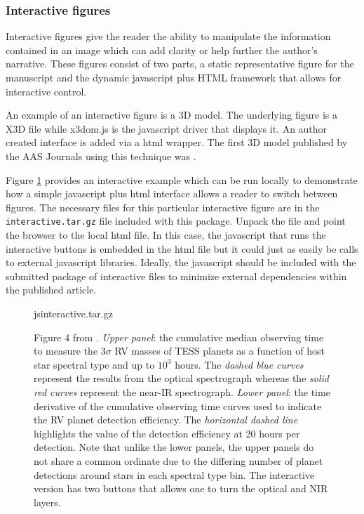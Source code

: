 \documentclass{aastex63}
\begin{document}
\subsubsection{Interactive figures \label{sec:interactive}}

Interactive figures give the reader the ability to manipulate the
information contained in an image which can add clarity or help further the
author's narrative.  These figures consist of two parts, a static 
representative figure for the manuscript and the dynamic javascript plus
HTML framework that allows for interactive control.

An example of an interactive figure is a 3D model.
The underlying figure is a X3D file while x3dom.js is the javascript driver
that displays it. An author created interface is added via a html wrapper.
The first 3D model published by the AAS Journals using this technique was
\citet{2014ApJ...793..127V}.  

Figure \ref{fig:interactive} provides an interactive example which can be
run locally to demonstrate how a simple javascript plus html interface
allows a reader to switch between figures. The necessary files for this
particular interactive figure are in the {\tt\string interactive.tar.gz}
file included with this package. Unpack the file and point the browser to
the local html file. In this case, the javascript that runs the interactive
buttons is embedded in the html file but it could just as easily be calls
to external javascript libraries. Ideally, the javascript should be
included with the submitted package of interactive files to minimize
external dependencies within the published article.

\begin{figure}
\begin{interactive}{js}{interactive.tar.gz}
\end{interactive}
\caption{Figure 4 from \citet{2018AJ....156...82C}. \emph{Upper panel}: the
cumulative median observing time to measure the $3\sigma$ RV masses of TESS
planets as a function of host star spectral type and up to $10^3$ hours.
The \emph{dashed blue curves} represent the results from the optical
spectrograph whereas the \emph{solid red curves} represent the near-IR
spectrograph. \emph{Lower panel}: the time derivative of the cumulative
observing time curves used to indicate the RV planet detection efficiency.
The \emph{horizontal dashed line} highlights the value of the detection
efficiency at 20 hours per detection.  Note that unlike the lower panels,
the upper panels do not share a common ordinate due to the differing number
of planet detections around stars in each spectral type bin. The
interactive version has two buttons that allows one to turn the optical and
NIR layers. \label{fig:interactive}}
\end{figure}
\end{document}
